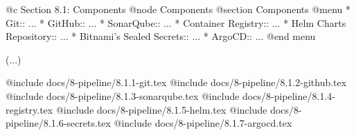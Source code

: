 @c Section 8.1: Components
@node Components
@section Components
@menu
* Git:: ...
* GitHub:: ...
* SonarQube:: ...
* Container Registry:: ...
* Helm Charts Repository:: ...
* Bitnami's Sealed Secrets:: ...
* ArgoCD:: ...
@end menu

(...)

@include docs/8-pipeline/8.1.1-git.tex
@include docs/8-pipeline/8.1.2-github.tex
@include docs/8-pipeline/8.1.3-sonarqube.tex
@include docs/8-pipeline/8.1.4-registry.tex
@include docs/8-pipeline/8.1.5-helm.tex
@include docs/8-pipeline/8.1.6-secrets.tex
@include docs/8-pipeline/8.1.7-argocd.tex
